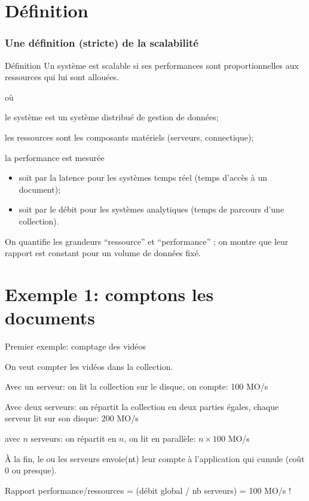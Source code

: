 
\section{Définition}


\begin{frame}
\frametitle{Une définition (stricte) de la scalabilité}


\begin{defblock}{Définition}
Un \alert{système} est \alert{scalable}  si ses \alert{performances}
sont proportionnelles aux \alert{ressources} qui lui sont allouées.
\end{defblock}

où
\begin{redbullet}
 \item le \alert{système} est un système distribué de gestion de données;
  \item les \alert{ressources} sont les composants matériels (serveurs, connectique);
  \item la \alert{performance} est mesurée
  \begin{itemize}
    \item soit par la \alert{latence} pour les systèmes temps réel (temps d'accès à un document);
    \item soit par le \alert{débit} pour les systèmes analytiques (temps de parcours d'une collection).
  \end{itemize}
\end{redbullet}

On quantifie les grandeurs ``ressource'' et ``performance'' ; on montre que 
leur rapport est constant pour un volume de données fixé.

\end{frame}


\section{Exemple 1: comptons les documents}

\begin{frame}{Premier exemple: comptage des vidéos}

On veut compter les vidéos dans la collection. 

\vfill

\begin{redbullet}
  \item Avec un serveur: on lit la collection sur le disque, on compte: 100 MO/s
  \item Avec deux serveurs: on répartit la collection en deux parties égales, chaque
      serveur lit sur son disque: 200 MO/s
   \item avec $n$ serveurs: on répartit en $n$, on lit en parallèle: $n \times 100$ MO/s
\end{redbullet} 

À la fin, le ou les serveurs envoie(nt) leur compte à l'application qui cumule (coût 0 ou presque).

\vfill

Rapport performance/ressources = (débit global / nb serveurs) = 100 MO/s !
\end{frame}

